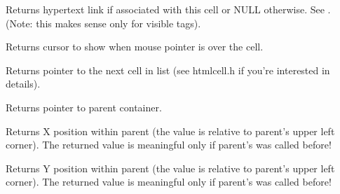 Returns hypertext link if associated with this cell or NULL otherwise.
See .
(Note: this makes sense only for visible tags).



\label{wxhtmlcellgetmousecursor}


Returns cursor to show when mouse pointer is over the cell.



\label{wxhtmlcellgetnext}


Returns pointer to the next cell in list (see htmlcell.h if you're
interested in details).

\label{wxhtmlcellgetparent}


Returns pointer to parent container.

\label{wxhtmlcellgetposx}


Returns X position within parent (the value is relative to parent's
upper left corner). The returned value is meaningful only if
parent's  was called before!

\label{wxhtmlcellgetposy}


Returns Y position within parent (the value is relative to parent's
upper left corner). The returned value is meaningful only if
parent's  was called before!

\label{wxhtmlcellgetwidth}


